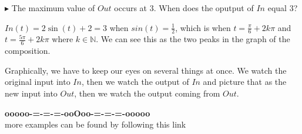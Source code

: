 \documentclass{ximera}
\begin{document}
$\blacktriangleright$ The maximum value of $Out$ occurs at $3$.  When does the oputput of $In$ equal $3$?



$In(t) = 2 \sin(t)+2 = 3$ when $sin(t) = \frac{1}{2}$, which is when $t = \frac{\pi}{6} + 2k\pi$ and $t = \frac{5\pi}{6} + 2k\pi$ where $k \in \mathbb{N}$. We can see this as the two peaks in the graph of the composition.

















Graphically, we have to keep our eyes on several things at once.  We watch the original input into $In$, then we watch the output of $In$ and picture that as the new input into $Out$, then we watch the output coming from $Out$.























\begin{center}
\textbf{\textcolor{green!50!black}{ooooo-=-=-=-ooOoo-=-=-=-ooooo}} \\

more examples can be found by following this link\\ 

\end{center}
\end{document}
